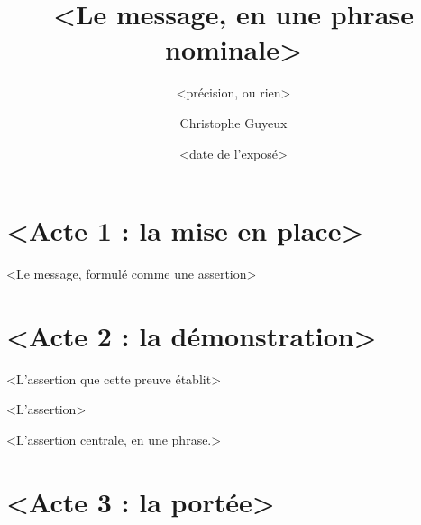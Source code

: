 \documentclass[aspectratio=169,11pt]{beamer}
\title{<Le message, en une phrase nominale>}
\subtitle{<précision, ou rien>}
\author{Christophe Guyeux}
\institute{FEMTO-ST, UMR 6174 CNRS \textperiodcentered\ Universit\'e Marie et Louis Pasteur}
\date{<date de l'exposé>}
\begin{document}
\begin{frame}[plain]\titlepage\end{frame}

\section{<Acte 1 : la mise en place>}

\begin{frame}{<Le message, formulé comme une assertion>}
\end{frame}

\section{<Acte 2 : la démonstration>}

\begin{frame}{<L'assertion que cette preuve établit>}
\end{frame}

\begin{frame}{<L'assertion>}
\end{frame}

\begin{sliderupture}
<L'assertion centrale, en une phrase.>
\end{sliderupture}

\section{<Acte 3 : la portée>}
\end{document}
